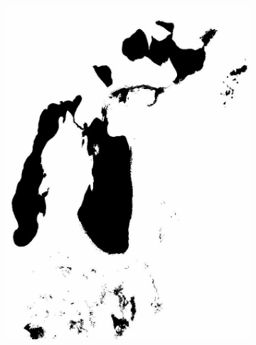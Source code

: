 \documentclass[12pt,a4paper]{article}
\begin{document}
\begin{figure}
\begin{subfigure}[b]{0.19\textwidth}
        \includegraphics[width=\textwidth]{../img/2006w.jpg}
    \end{subfigure}
    \begin{subfigure}[b]{0.19\textwidth}
        \centering

\end{subfigure}
\end{figure}
\end{document}
